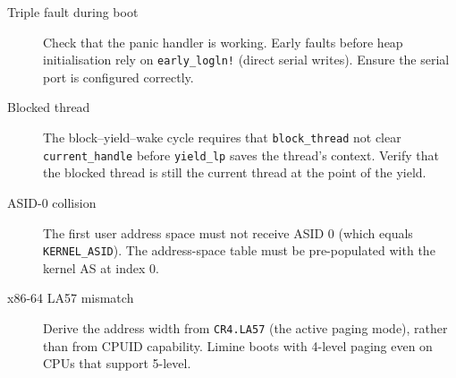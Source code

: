 \begin{description}
    \item[Triple fault during boot] Check that the panic handler is working.
        Early faults before heap initialisation rely on
        \texttt{early\_logln!} (direct serial writes). Ensure the serial port
        is configured correctly.
    \item[Blocked thread] The block--yield--wake cycle requires
        that \texttt{block\_thread} not clear \texttt{current\_handle} before
        \texttt{yield\_lp} saves the thread's context. Verify that the
        blocked thread is still the current thread at the point of the yield.
    \item[ASID-0 collision] The first user address space must not receive
        ASID 0 (which equals \texttt{KERNEL\_ASID}). The address-space table
        must be pre-populated with the kernel AS at index 0.
    \item[x86-64 LA57 mismatch] Derive the address width from
        \texttt{CR4.LA57} (the active paging mode), rather than from CPUID capability.
        Limine boots with 4-level paging even on CPUs that support 5-level.
\end{description}

\endinput
